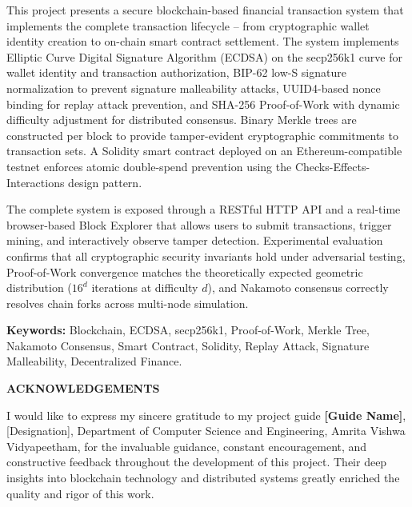 \documentclass[12pt,a4paper]{report}
\begin{document}
This project presents a secure blockchain-based financial transaction system that implements
the complete transaction lifecycle -- from cryptographic wallet identity creation to on-chain
smart contract settlement. The system implements Elliptic Curve Digital Signature Algorithm
(ECDSA) on the secp256k1 curve for wallet identity and transaction authorization, BIP-62
low-S signature normalization to prevent signature malleability attacks, UUID4-based nonce
binding for replay attack prevention, and SHA-256 Proof-of-Work with dynamic difficulty
adjustment for distributed consensus. Binary Merkle trees are constructed per block to
provide tamper-evident cryptographic commitments to transaction sets. A Solidity smart
contract deployed on an Ethereum-compatible testnet enforces atomic double-spend prevention
using the Checks-Effects-Interactions design pattern.

The complete system is exposed through a RESTful HTTP API and a real-time browser-based
Block Explorer that allows users to submit transactions, trigger mining, and interactively
observe tamper detection. Experimental evaluation confirms that all cryptographic security
invariants hold under adversarial testing, Proof-of-Work convergence matches the
theoretically expected geometric distribution ($16^d$ iterations at difficulty $d$), and
Nakamoto consensus correctly resolves chain forks across multi-node simulation.

\vspace{0.5cm}
\noindent\textbf{Keywords:} Blockchain, ECDSA, secp256k1, Proof-of-Work, Merkle Tree,
Nakamoto Consensus, Smart Contract, Solidity, Replay Attack, Signature Malleability,
Decentralized Finance.

\newpage

\thispagestyle{plain}
\begin{center}
  {\fontsize{16}{22}\bfseries ACKNOWLEDGEMENTS}
\end{center}
\vspace{0.5cm}

\noindent
I would like to express my sincere gratitude to my project guide \textbf{[Guide Name]},
[Designation], Department of Computer Science and Engineering, Amrita Vishwa Vidyapeetham,
for the invaluable guidance, constant encouragement, and constructive feedback throughout
the development of this project. Their deep insights into blockchain technology and
distributed systems greatly enriched the quality and rigor of this work.
\end{document}
